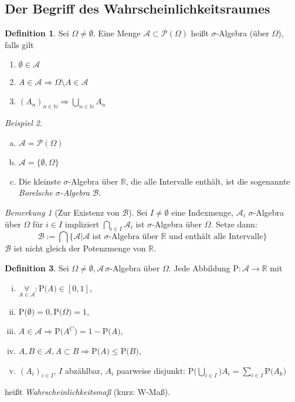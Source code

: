 \documentclass[a4paper,12pt,fleqn]{scrartcl}
\newcommand{\N}{\mathbb{N}}
\newcommand{\R}{\mathbb{R}}
\newcommand{\m}[1]{\mathcal{ #1 }}
\newcommand{\prob}[1]{\text{P(} #1 \text{)}}
\newcommand{\impl}{\Rightarrow}
\newcommand{\fa}[1]{\mathop{\forall}\limits_{#1}}
\theoremstyle{definition}
\newtheorem{definition}{Definition}[section]
\theoremstyle{plain}
\theoremstyle{remark}
\newtheorem*{bemerkung}{Bemerkung}
\newtheorem{beispiel}[definition]{Beispiel}
\begin{document}
\subsection{Der Begriff des Wahrscheinlichkeitsraumes}
\begin{definition}
Sei $\Omega\neq\emptyset$. Eine Menge $\m{A}\subset\m{P}(\Omega)$  heißt $\sigma$-Algebra (über $\Omega$), falls gilt
\begin{enumerate}
\item $\emptyset\in\m{A}$
\item $A\in\m{A}\impl \Omega\setminus A\in\m{A}$
\item $(A_n)_{n\in\N}\impl\bigcup_{n\in\N}A_n$
\end{enumerate}
\end{definition}
\begin{beispiel}
\begin{enumerate}[a)]
\item $\m{A}=\m{P}(\Omega)$
\item $\m{A}=\{\emptyset,\Omega\}$
\item Die kleinste $\sigma$-Algebra über $\R$, die alle Intervalle enthält, ist die sogenannte \emph{Borelsche $\sigma$-Algebra} $\m{B}$.
\end{enumerate}
\end{beispiel}
\begin{bemerkung}[Zur Existenz von $\m{B}$]
Sei $I\neq\emptyset$ eine Indexmenge, $\m{A}_i$ $\sigma$-Algebra über $\Omega$ für $i\in I$ impliziert $\bigcap_{i\in I}\m{A}_i$ ist $\sigma$-Algebra über $\Omega$. Setze dann:
\[\m{B}:=\bigcap\{\m{A}|\m{A}\text{ ist }\sigma\text{-Algebra über }\R\text{ und enthält alle Intervalle}\}\]
$\m{B}$ ist nicht gleich der Potenzmenge von $\R$.
\end{bemerkung}
\begin{definition}
Sei $\Omega\neq\emptyset,\m{A} \, \sigma$-Algebra über $\Omega$. Jede Abbildung $\text{P}:\m{A}\to\R$ mit
\begin{enumerate}[i.]
\item $\fa{A\in\m{A}}:\prob{A}\in\left[ 0,1\right]$,
\item $\prob{\emptyset}=0,\prob{\Omega}=1$,
\item $A\in\m{A}\impl \prob{A^C}=1-\prob{A}$,
\item $A,B\in\m{A},A\subset B\impl \prob{A}\leq \prob{B}$,
\item $(A_i)_{i\in I}$, $I$ abzählbar, $A_i$ paarweise disjunkt: $\prob{\bigcup_{i\in I}} A_i=\sum_{i\in I}\prob{A_k}$
\end{enumerate}
heißt \emph{Wahrscheinlichkeitsmaß} (kurz: W-Maß).
\end{definition}
\end{document}
